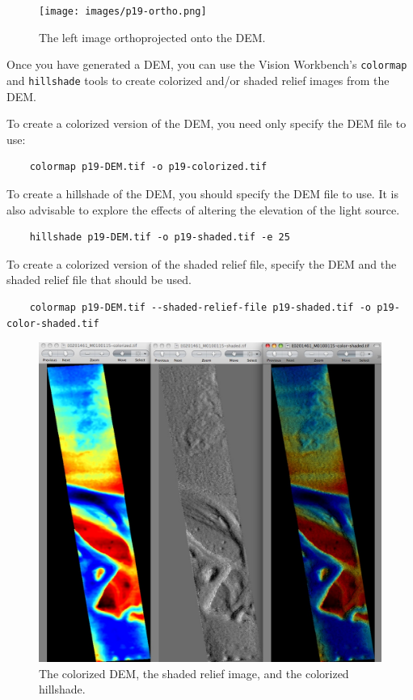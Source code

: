 \begin{figure}
\begin{center}
\texttt{[image: images/p19-ortho.png]}
\caption[P19 orthophoto]{
    \label{p19-ortho}
	The left image orthoprojected onto the DEM.
    }
\end{center}
\end{figure}

Once you have generated a DEM, you can use the Vision Workbench's
\texttt{colormap} and \texttt{hillshade} tools to create colorized
and/or shaded relief images from the DEM.

To create a colorized version of the DEM, you need only specify the
DEM file to use:

\begin{verbatim}
    colormap p19-DEM.tif -o p19-colorized.tif
\end{verbatim}

To create a hillshade of the DEM, you should specify the DEM file
to use. It is also advisable to explore the effects of altering the
elevation of the light source.

\begin{verbatim}
    hillshade p19-DEM.tif -o p19-shaded.tif -e 25
\end{verbatim}

To create a colorized version of the shaded relief file, specify
the DEM and the shaded relief file that should be used.

\begin{verbatim}
    colormap p19-DEM.tif --shaded-relief-file p19-shaded.tif -o p19-color-shaded.tif
\end{verbatim}

\begin{figure}
\begin{center}
\includegraphics[width=5in]{images/p19-colorized-shaded.png}
\caption[P19 colorized and shaded relief]{
    \label{p19-color}
	The colorized DEM, the shaded relief image, and the colorized hillshade.
    }
\end{center}
\end{figure}


